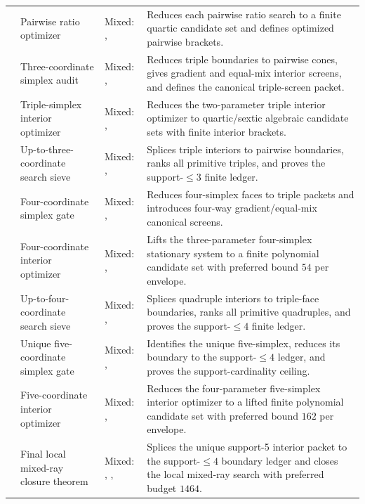 \begin{longtable}{@{}L{0.075\textwidth}L{0.34\textwidth}L{0.20\textwidth}L{0.33\textwidth}@{}}
 & Pairwise ratio optimizer & Mixed: \StatusExactClosure{}, \StatusNumerical{} & Reduces each pairwise ratio search to a finite quartic candidate set and defines optimized pairwise brackets. \\
 & Three-coordinate simplex audit & Mixed: \StatusExactClosure{}, \StatusNumerical{} & Reduces triple boundaries to pairwise cones, gives gradient and equal-mix interior screens, and defines the canonical triple-screen packet. \\
 & Triple-simplex interior optimizer & Mixed: \StatusExactClosure{}, \StatusNumerical{} & Reduces the two-parameter triple interior optimizer to quartic/sextic algebraic candidate sets with finite interior brackets. \\
 & Up-to-three-coordinate search sieve & Mixed: \StatusExactClosure{}, \StatusNumerical{} & Splices triple interiors to pairwise boundaries, ranks all primitive triples, and proves the support-\(\le3\) finite ledger. \\
 & Four-coordinate simplex gate & Mixed: \StatusExactClosure{}, \StatusNumerical{} & Reduces four-simplex faces to triple packets and introduces four-way gradient/equal-mix canonical screens. \\
 & Four-coordinate interior optimizer & Mixed: \StatusExactClosure{}, \StatusNumerical{} & Lifts the three-parameter four-simplex stationary system to a finite polynomial candidate set with preferred bound \(54\) per envelope. \\
 & Up-to-four-coordinate search sieve & Mixed: \StatusExactClosure{}, \StatusNumerical{} & Splices quadruple interiors to triple-face boundaries, ranks all primitive quadruples, and proves the support-\(\le4\) finite ledger. \\
 & Unique five-coordinate simplex gate & Mixed: \StatusExactClosure{}, \StatusNumerical{} & Identifies the unique five-simplex, reduces its boundary to the support-\(\le4\) ledger, and proves the support-cardinality ceiling. \\
 & Five-coordinate interior optimizer & Mixed: \StatusExactClosure{}, \StatusNumerical{} & Reduces the four-parameter five-simplex interior optimizer to a lifted finite polynomial candidate set with preferred bound \(162\) per envelope. \\
 & Final local mixed-ray closure theorem & Mixed: \StatusExactClosure{}, \StatusNumerical{}, \StatusOpen{} & Splices the unique support-5 interior packet to the support-\(\le4\) boundary ledger and closes the local mixed-ray search with preferred budget \(1464\). \\
\bottomrule
\end{longtable}

